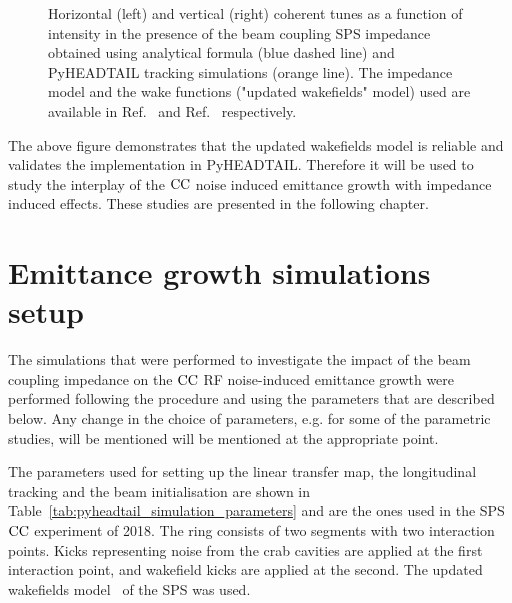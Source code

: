 \begin{figure}[!ht]
\begin{subfigure}[t]{0.45\textwidth}
    \end{subfigure}
    \hfill
     \caption{Horizontal (left) and vertical (right) coherent tunes as a function of intensity in the presence of the beam coupling SPS impedance obtained using analytical formula (blue dashed line) and PyHEADTAIL tracking simulations (orange line). The impedance model and the wake functions ("updated wakefields" model) used are available in Ref.~\cite{sps_impedance_model_git} and Ref.~\cite{updated_sps_wakfields_model} respectively.} %
     \label{fig:sps_coherent_DQ_vs_intensity_updated_model}
 \end{figure}

 The above figure demonstrates that the updated wakefields model is reliable and validates the implementation in PyHEADTAIL. Therefore it will be used to study the interplay of the ${\mathrm{CC}}$ noise induced emittance growth with impedance induced effects. These studies are presented in the following chapter.


\section{Emittance growth simulations setup}\label{sec:setup_simulations_emit_growth}
The simulations that were performed to investigate the impact of the beam coupling impedance on the ${\mathrm{CC}}$ RF noise-induced emittance growth were performed following the procedure and using the parameters that are described below. Any change in the choice of parameters, e.g. for some of the parametric studies, will be mentioned will be mentioned at the appropriate point.

The parameters used for setting up the linear transfer map, the longitudinal tracking and the beam initialisation are shown in Table~\ref{tab:pyheadtail_simulation_parameters} and are the ones used in the SPS ${\mathrm{CC}}$ experiment of 2018. The ring consists of two segments with two interaction points. Kicks representing noise from the crab cavities are applied at the first interaction point, and wakefield kicks are applied at the second. The updated wakefields model~\cite{updated_sps_wakfields_model} of the SPS was used.

